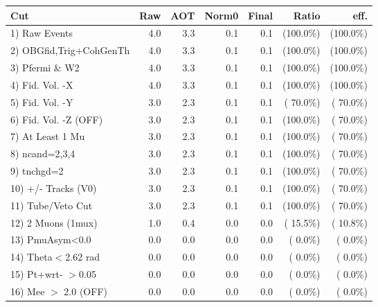  \begin{table}[h!]\centering
 \begin{tabular}{||l||r|r|r|r|r|r||}
 \hline
 \hline
 Cut & Raw & AOT & Norm0 & Final & Ratio & eff.       \\
 \hline
  1) Raw Events           &          4.0 &          3.3 &          0.1 &          0.1 & (100.0\%) & (100.0\%) \\
  2) OBGfid,Trig+CohGenTh &          4.0 &          3.3 &          0.1 &          0.1 & (100.0\%) & (100.0\%) \\
  3) Pfermi \& W2         &          4.0 &          3.3 &          0.1 &          0.1 & (100.0\%) & (100.0\%) \\
  4) Fid. Vol. -X         &          4.0 &          3.3 &          0.1 &          0.1 & (100.0\%) & (100.0\%) \\
  5) Fid. Vol. -Y         &          3.0 &          2.3 &          0.1 &          0.1 & ( 70.0\%) & ( 70.0\%) \\
  6) Fid. Vol. -Z (OFF)   &          3.0 &          2.3 &          0.1 &          0.1 & (100.0\%) & ( 70.0\%) \\
  7) At Least 1 Mu        &          3.0 &          2.3 &          0.1 &          0.1 & (100.0\%) & ( 70.0\%) \\
  8) ncand=2,3,4          &          3.0 &          2.3 &          0.1 &          0.1 & (100.0\%) & ( 70.0\%) \\
  9) tnchgd=2             &          3.0 &          2.3 &          0.1 &          0.1 & (100.0\%) & ( 70.0\%) \\
 10) +/- Tracks (V0)      &          3.0 &          2.3 &          0.1 &          0.1 & (100.0\%) & ( 70.0\%) \\
 11) Tube/Veto Cut        &          3.0 &          2.3 &          0.1 &          0.1 & (100.0\%) & ( 70.0\%) \\
 12) 2 Muons (1mux)       &          1.0 &          0.4 &          0.0 &          0.0 & ( 15.5\%) & ( 10.8\%) \\
 13) PmuAsym<0.0          &          0.0 &          0.0 &          0.0 &          0.0 & (  0.0\%) & (  0.0\%) \\
 14) Theta$<$2.62 rad     &          0.0 &          0.0 &          0.0 &          0.0 & (  0.0\%) & (  0.0\%) \\
 15) Pt+wrt- $>$0.05      &          0.0 &          0.0 &          0.0 &          0.0 & (  0.0\%) & (  0.0\%) \\
 16) Mee $>$ 2.0  (OFF)   &          0.0 &          0.0 &          0.0 &          0.0 & (  0.0\%) & (  0.0\%) \\

\end{tabular}
\end{table}
